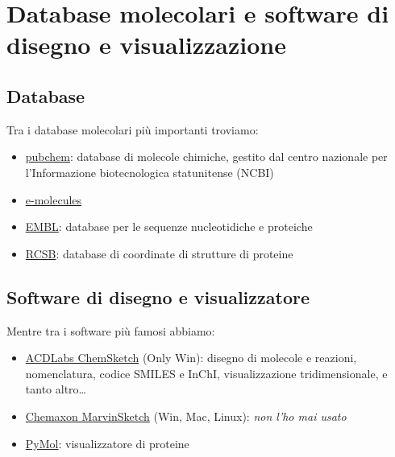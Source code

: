 \chapter{Database molecolari e software di disegno e visualizzazione}
\section{Database}
\noindent Tra i database molecolari più importanti troviamo:
\begin{itemize}
	\item \href{https://pubchem.ncbi.nlm.nih.gov}{pubchem}: database di molecole chimiche, gestito dal centro nazionale per l'Informazione biotecnologica statunitense (NCBI)
	\item \href{https://www.emolecules.com}{e-molecules}
	\item \href{https://www.ebi.ac.uk}{EMBL}: database per le sequenze nucleotidiche e proteiche
	\item \href{www.rcsb.org}{RCSB}: database di coordinate di strutture di proteine
\end{itemize}

\section{Software di disegno e visualizzatore}
\noindent Mentre tra i software più famosi abbiamo:
\begin{itemize}
	\item \href{https://www.acdlabs.com/resources/free-chemistry-software-apps/chemsketch-freeware/#chemsketch_modal}{ACDLabs ChemSketch} (Only Win): disegno di molecole e reazioni, nomenclatura, codice SMILES e InChI, visualizzazione tridimensionale, e tanto altro\dots
	\item \href{https://chemaxon.com/products/marvin}{Chemaxon MarvinSketch} (Win, Mac, Linux): \textit{non l'ho mai usato}
 \item \href{www.pymol.org}{PyMol}: visualizzatore di proteine
\end{itemize}